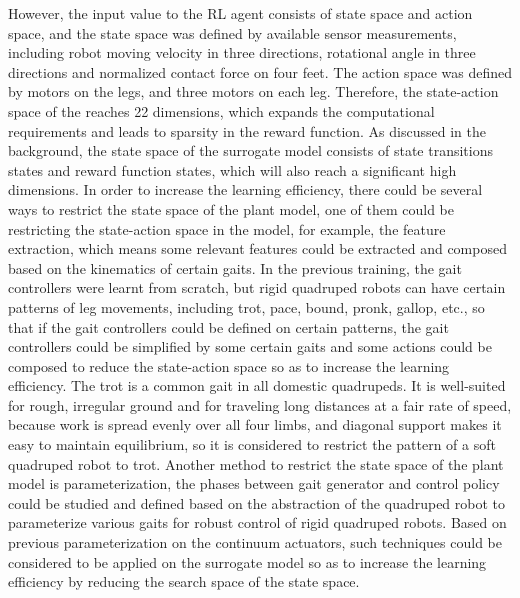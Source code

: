  However, the input value to the \ac{RL} agent consists of state space and action space, and the state space was defined by available sensor measurements, including robot moving velocity in three directions, rotational angle in three directions and normalized contact force on four feet\cite{jiSynthesizingOptimalGait2022}. The action space was defined by motors on the legs, and three motors on each leg\cite{jiSynthesizingOptimalGait2022}. Therefore, the state-action space of the reaches 22 dimensions, which expands the computational requirements and leads to sparsity in the reward function. As discussed in the background, the state space of the surrogate model consists of state transitions states and reward function states, which will also reach a significant high dimensions. In order to increase the learning efficiency, there could be several ways to restrict the state space of the plant model, one of them could be restricting the state-action space in the model, for example, the feature extraction, which means some relevant features could be extracted and composed based on the kinematics of certain gaits. In the previous training\cite{jiSynthesizingOptimalGait2022}, the gait controllers were learnt from scratch, but rigid quadruped robots can have certain patterns of leg movements, including trot, pace, bound, pronk, gallop, etc.\cite{zhongAnalysisResearchQuadruped2019}, so that if the gait controllers could be defined on certain patterns, the gait controllers could be simplified by some certain gaits and some actions could be composed to reduce the state-action space so as to increase the learning efficiency\cite{owakiQuadrupedRobotExhibiting2017}. The trot is a common gait in all domestic quadrupeds\cite{jiOmnidirectionalWalkingQuadruped2022}. It is well-suited for rough, irregular ground and for traveling long distances at a fair rate of speed, because work is spread evenly over all four limbs, and diagonal support makes it easy to maintain equilibrium\cite{fletcherTrot2012}, so it is considered to restrict the pattern of a soft quadruped robot to trot. Another method to restrict the state space of the plant model is parameterization, the phases between gait generator and control policy could be studied and defined based on the abstraction of the quadruped robot to parameterize various gaits for robust control of rigid quadruped robots\cite{shaoLearningFreeGait2022}. Based on previous parameterization on the continuum actuators\cite{jiOmnidirectionalWalkingQuadruped2022}, such techniques could be considered to be applied on the surrogate model so as to increase the learning efficiency by reducing the search space of the state space.

